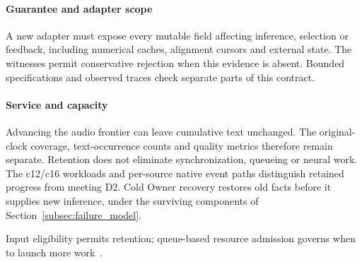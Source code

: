 \paragraph{Guarantee and adapter scope}
A new adapter must expose every mutable field affecting inference,
selection or feedback, including numerical caches, alignment cursors and
external state. The witnesses permit conservative rejection when this
evidence is absent. Bounded specifications and observed traces check
separate parts of this contract.

\paragraph{Service and capacity}
Advancing the audio frontier can leave cumulative text unchanged.
The original-clock coverage, text-occurrence counts and quality metrics
therefore remain separate. Retention does not eliminate synchronization,
queueing or neural work. The c12/c16 workloads and per-source native
event paths distinguish retained progress from meeting D2. Cold Owner recovery
restores old facts before it supplies new inference, under the surviving
components of Section~\ref{subsec:failure_model}.

Input eligibility permits retention; queue-based resource admission
governs when to launch more work~\cite{welsh2001seda}.
